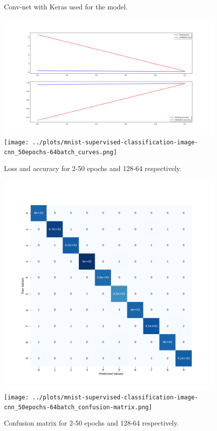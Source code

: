 \documentclass{article}
\begin{document}
\begin{figure}[!htbp]
  \caption{Conv-net with Keras used for the model.}
\end{figure}

\begin{figure}[!htbp]
  \centering
  \includegraphics[scale=0.25]{../plots/mnist-supervised-classification-image-cnn_2epochs-128batch_curves.png}
  \texttt{[image: ../plots/mnist-supervised-classification-image-cnn\_50epochs-64batch\_curves.png]}
  \caption{Loss and accuracy for 2-50 epochs and 128-64 respectively.}
\end{figure}

\begin{figure}[!htbp]
  \centering
  \includegraphics[scale=0.25]{../plots/mnist-supervised-classification-image-cnn_2epochs-128batch_confusion-matrix.png}
  \hspace{\fill}
  \texttt{[image: ../plots/mnist-supervised-classification-image-cnn\_50epochs-64batch\_confusion-matrix.png]}
  \caption{Confusion matrix for 2-50 epochs and 128-64 respectively.}
\end{figure}
\end{document}
